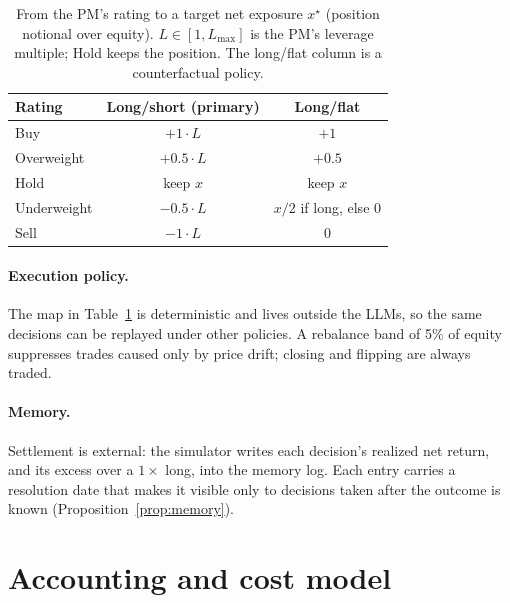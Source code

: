 \documentclass[11pt]{article}
\theoremstyle{remark}
\begin{document}
\begin{table}[t]\centering\small
\caption{From the PM's rating to a target net exposure $x^\star$ (position notional over equity). $L\in[1,L_{\max}]$ is the PM's leverage multiple; Hold keeps the position. The long/flat column is a counterfactual policy.}\label{tab:map}
\begin{tabular}{lcc}\toprule
Rating & Long/short (primary) & Long/flat \\\midrule
Buy & $+1\cdot L$ & $+1$\\
Overweight & $+0.5\cdot L$ & $+0.5$\\
Hold & keep $x$ & keep $x$\\
Underweight & $-0.5\cdot L$ & $x/2$ if long, else 0\\
Sell & $-1\cdot L$ & 0\\\bottomrule
\end{tabular}
\end{table}

\paragraph{Execution policy.} The map in Table~\ref{tab:map} is deterministic and lives outside the LLMs, so the same decisions can be replayed under other policies. A rebalance band of 5\% of equity suppresses trades caused only by price drift; closing and flipping are always traded.

\paragraph{Memory.} Settlement is external: the simulator writes each decision's realized net return, and its excess over a $1\times$ long, into the memory log. Each entry carries a resolution date that makes it visible only to decisions taken after the outcome is known (Proposition~\ref{prop:memory}).

\section{Accounting and cost model}\label{sec:model}
\end{document}

